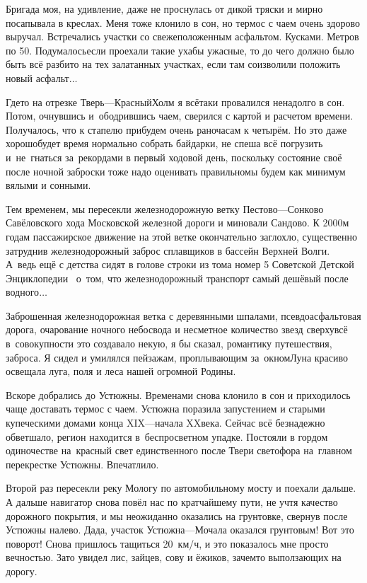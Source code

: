 Бригада моя, на удивление, даже не проснулась от дикой тряски и мирно посапывала в креслах. Меня тоже клонило в сон, но термос с чаем очень здорово выручал. Встречались участки со свежеположенным асфальтом. Кусками. Метров по 50\thinspace\nbdash{}. Подумалось\mdash если проехали такие ухабы ужасные, то до чего должно было быть всё разбито на тех залатанных участках, если там соизволили положить новый асфальт$\ldots$ 
 
Где\sdash то на отрезке Тверь\thinspace\nobreakdash---\thinspace Красный\thinspace Холм я всё\sdash таки провалился ненадолго в сон. Потом, очнувшись и~ободрившись чаем, сверился с картой и расчетом времени. Получалось, что к стапелю прибудем очень рано\mdash часам к четырём. Но это даже хорошо\mdash будет время нормально собрать байдарки, не спеша всё погрузить и~не~гнаться за~рекордами в первый ходовой день, поскольку состояние своё после ночной заброски тоже надо оценивать правильно\mdash мы будем как минимум вялыми и сонными. 

Тем временем, мы пересекли железнодорожную ветку Пестово\thinspace\nobreakdash---\thinspace Сонково Савёловского хода Московской железной дороги и миновали Сандово. К 2000\sdash м годам пассажирское движение на этой ветке окончательно заглохло, существенно затруднив железнодорожный заброс сплавщиков в бассейн Верхней Волги. А~ведь ещё с детства сидят в голове строки из тома номер 5 Советской Детской Энциклопедии~\cite{ДетскаяЭнциклопедия} о~том, что железнодорожный транспорт самый дешёвый после водного$\ldots$ 

Заброшенная железнодорожная ветка с деревянными шпалами, псевдоасфальтовая дорога, очарование ночного небосвода и несметное количество звезд сверху\mdash всё в~совокупности это создавало некую, я бы сказал, романтику путешествия, заброса. Я сидел и умилялся пейзажам, проплывающим за~окном\mdash Луна красиво освещала луга, поля и леса нашей огромной Родины. 

Вскоре добрались до Устюжны. Временами снова клонило в сон и приходилось чаще доставать термос с чаем. Устюжна поразила запустением и старыми купеческими домами конца XIX\thinspace\nobreakdash---\thinspace начала XX\thinspace века. Сейчас всё безнадежно обветшало, регион находится в~беспросветном упадке. Постояли в гордом одиночестве на~красный свет единственного после Твери светофора на~главном перекрестке Устюжны. Впечатлило. 

Второй раз пересекли реку Мологу по автомобильному мосту и поехали дальше. А дальше навигатор снова повёл нас по кратчайшему пути, не учтя качество дорожного покрытия, и мы неожиданно оказались на грунтовке, свернув после Устюжны налево. Да\sdash да,  участок Устюжна\thinspace\nobreakdash---\thinspace Мочала оказался грунтовым! Вот это поворот! Снова пришлось тащиться 20\thinspace\nbdash{}~км/ч, и это показалось мне просто вечностью. Зато увидел лис, зайцев, сову и ёжиков, зачем\sdash то выползающих на дорогу. 

